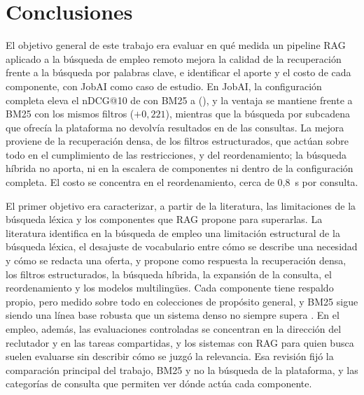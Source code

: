 \section{Conclusiones}

El objetivo general de este trabajo era evaluar en qué medida un pipeline RAG aplicado a la búsqueda de empleo remoto mejora la calidad de la recuperación frente a la búsqueda por palabras clave, e identificar el aporte y el costo de cada componente, con JobAI como caso de estudio. En JobAI, la configuración completa eleva el nDCG@10 de \cNdcgBM{} con BM25 a \cNdcgCompleta{} (\cDifCompletaBMIC), y la ventaja se mantiene frente a BM25 con los mismos filtros ($+0{,}221$), mientras que la búsqueda por subcadena que ofrecía la plataforma no devolvía resultados en \cIlikeVacias{} de las \cConsultasRecuperacion{} consultas. La mejora proviene de la recuperación densa, de los filtros estructurados, que actúan sobre todo en el cumplimiento de las restricciones, y del reordenamiento; la búsqueda híbrida no aporta, ni en la escalera de componentes ni dentro de la configuración completa. El costo se concentra en el reordenamiento, cerca de 0,8~s por consulta.

El primer objetivo era caracterizar, a partir de la literatura, las limitaciones de la búsqueda léxica y los componentes que RAG propone para superarlas. La literatura identifica en la búsqueda de empleo una limitación estructural de la búsqueda léxica, el desajuste de vocabulario entre cómo se describe una necesidad y cómo se redacta una oferta, y propone como respuesta la recuperación densa, los filtros estructurados, la búsqueda híbrida, la expansión de la consulta, el reordenamiento y los modelos multilingües. Cada componente tiene respaldo propio, pero medido sobre todo en colecciones de propósito general, y BM25 sigue siendo una línea base robusta que un sistema denso no siempre supera \citep{Thakur2021}. En el empleo, además, las evaluaciones controladas se concentran en la dirección del reclutador y en las tareas compartidas, y los sistemas con RAG para quien busca suelen evaluarse sin describir cómo se juzgó la relevancia. Esa revisión fijó la comparación principal del trabajo, BM25 y no la búsqueda de la plataforma, y las categorías de consulta que permiten ver dónde actúa cada componente.

